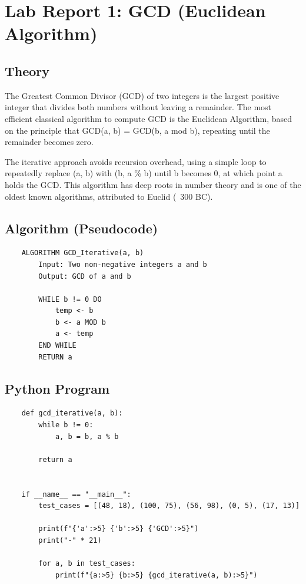 \documentclass{article}
\begin{document}
\newpage

\section*{Lab Report 1: GCD (Euclidean Algorithm)}

\subsection*{Theory}
The Greatest Common Divisor (GCD) of two integers is the largest positive integer that divides both numbers without leaving a remainder. The most efficient classical algorithm to compute GCD is the Euclidean Algorithm, based on the principle that GCD(a, b) = GCD(b, a mod b), repeating until the remainder becomes zero.

The iterative approach avoids recursion overhead, using a simple loop to repeatedly replace (a, b) with (b, a \% b) until b becomes 0, at which point a holds the GCD. This algorithm has deep roots in number theory and is one of the oldest known algorithms, attributed to Euclid (~300 BC).

\subsection*{Algorithm (Pseudocode)}
\begin{verbatim}
    ALGORITHM GCD_Iterative(a, b)
        Input: Two non-negative integers a and b
        Output: GCD of a and b

        WHILE b != 0 DO
            temp <- b
            b <- a MOD b
            a <- temp
        END WHILE
        RETURN a
\end{verbatim}

\subsection*{Python Program}
\begin{verbatim}
    def gcd_iterative(a, b):
        while b != 0:
            a, b = b, a % b

        return a


    if __name__ == "__main__":
        test_cases = [(48, 18), (100, 75), (56, 98), (0, 5), (17, 13)]

        print(f"{'a':>5} {'b':>5} {'GCD':>5}")
        print("-" * 21)

        for a, b in test_cases:
            print(f"{a:>5} {b:>5} {gcd_iterative(a, b):>5}")
\end{verbatim}
\end{document}
